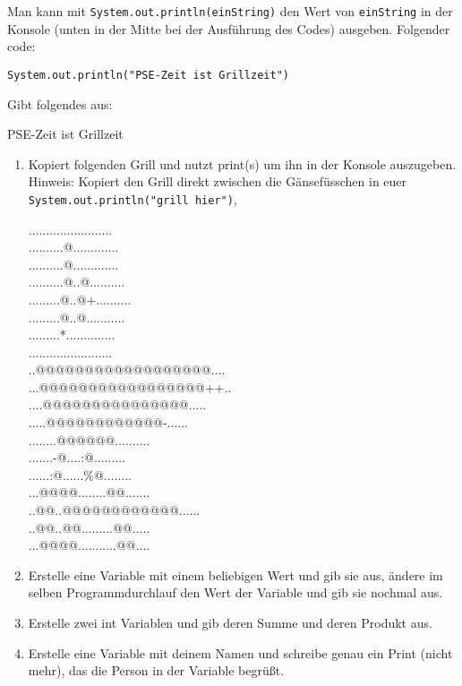 \documentclass{../../sheet}
\begin{document}
Man kann mit \texttt{System.out.println(einString)} den Wert von \texttt{einString} in der Konsole (unten in der Mitte bei der Ausführung des Codes) ausgeben. Folgender code:
\begin{verbatim}
System.out.println("PSE-Zeit ist Grillzeit")
\end{verbatim}
Gibt folgendes aus:
\begin{ausgabe}
    PSE-Zeit ist Grillzeit
\end{ausgabe}

\begin{enumerate}
    \item Kopiert folgenden Grill und nutzt print(s) um ihn in der Konsole auszugeben.\\
    Hinweis: Kopiert den Grill direkt zwischen die Gänsefüsschen in euer \\\texttt{System.out.println("grill hier")},  
          \begin{ausgabe}
........................\\
..........@.............\\
..........@.............\\
..........@..@..........\\
.........@..@+..........\\
.........@..@...........\\
.........*..............\\
........................\\
..@@@@@@@@@@@@@@@@@@....\\
...@@@@@@@@@@@@@@@@@++..\\
....@@@@@@@@@@@@@@@.....\\
.....@@@@@@@@@@@@-......\\
........@@@@@@..........\\
.......-@....:@.........\\
......:@......\%@........\\
...@@@@........@@.......\\
..@@..@@@@@@@@@@@@......\\
..@@..@@.........@@.....\\
...@@@@...........@@....
          \end{ausgabe}
    \item Erstelle eine Variable mit einem beliebigen Wert und gib sie aus, ändere im selben Programmdurchlauf den Wert der Variable und gib sie nochmal aus.
    \item Erstelle zwei int Variablen und gib deren Summe und deren Produkt aus.
    \item Erstelle eine Variable mit deinem Namen und schreibe genau ein Print (nicht mehr), das die Person in der Variable begrüßt.
\end{enumerate}
\end{document}
